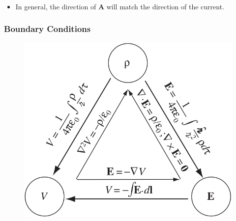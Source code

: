 \documentclass{article}
\renewcommand{\vec}[1]{\boldsymbol{\mathbf{#1}}}
\begin{document}
\begin{itemize}
  \item In general, the direction of $\vec{A}$ will match the direction of the current.
\end{itemize}

\subsubsection{Boundary Conditions}

\begin{figure}[H]
  \centering
  \includegraphics[scale=0.5]{electrostatic-relations}
\end{figure}
\end{document}
